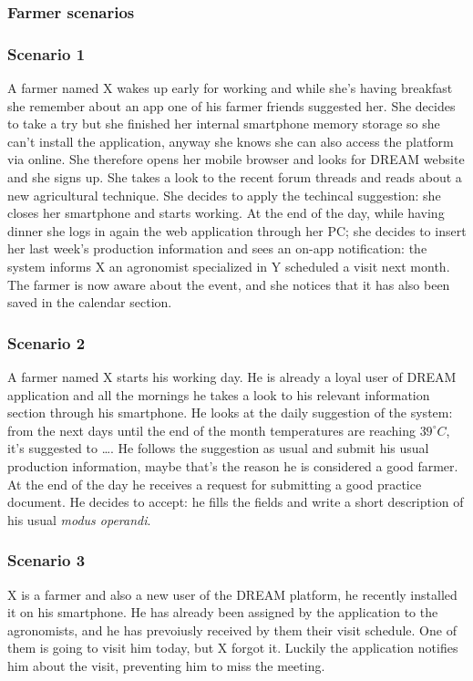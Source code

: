 \subsubsection{Farmer scenarios}

\subsubsection*{Scenario 1}
A farmer named X wakes up early for working and while she's having breakfast she remember about an app one of his farmer friends suggested her. She decides to take a try but she finished her internal smartphone memory storage so she can't install the application, anyway she knows she can also access the platform via online. She therefore opens her mobile browser and looks for DREAM website and she signs up. She takes a look to the recent forum threads and reads about a new agricultural technique. She decides to apply the techincal suggestion: she closes her smartphone and starts working. At the end of the day, while having dinner she logs in again the web application through her PC; she decides to insert her last week's production information and sees an on-app notification: the system informs X an agronomist specialized in Y scheduled a visit next month. The farmer is now aware about the event, and she notices that it has also been saved in the calendar section.

\subsubsection*{Scenario 2}
A farmer named X starts his working day. He is already a loyal user of DREAM application and all the mornings he takes a look to his relevant information section through his smartphone. He looks at the daily suggestion of the system: from the next days until the end of the month temperatures are reaching $39^\circ C$, it's suggested to \ldots. He follows the suggestion as usual and submit his usual production information, maybe that's the reason he is considered a good farmer. At the end of the day he receives a request for submitting a good practice document. He decides to accept: he fills the fields and write a short description of his usual \textit{modus operandi}.

\subsubsection*{Scenario 3}
X is a farmer and also a new user of the DREAM platform, he recently installed it on his smartphone. He has already been assigned by the application to the agronomists, and he has prevoiusly received by them their visit schedule. One of them is going to visit him today, but X forgot it. Luckily the application notifies him about the visit, preventing him to miss the meeting.

